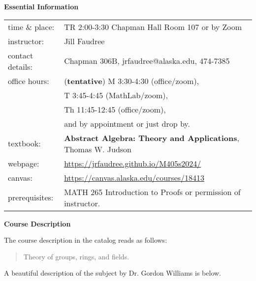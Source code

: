 \documentclass[12pt]{article}
\begin{document}
\textbf{\large{Essential Information}}

\begin{tabular}{p{} p{}}
{time \& place}:&TR 2:00-3:30 Chapman Hall Room 107 or by Zoom\\
{instructor:} &Jill Faudree\\
{contact details:} &Chapman 306B, jrfaudree@alaska.edu, 474-7385\\
{office hours:} &(\textbf{tentative})  M 3:30-4:30 (office/zoom), \\
& T 3:45-4:45 (MathLab/zoom),\\ 
&Th 11:45-12:45 (office/zoom),\\
&and by appointment or just drop by.\\
{textbook:}& \textbf{Abstract Algebra: Theory and Applications}, Thomas W. Judson\\
{webpage:}& \url{https://jrfaudree.github.io/M405s2024/}\\
canvas:&\url{https://canvas.alaska.edu/courses/18413}\\
{prerequisites:} & MATH 265 Introduction to Proofs or permission of instructor.
\end{tabular}



\textbf{\large{Course Description}}

The course description in the catalog reads as follows:
\begin{quote} Theory of groups, rings, and fields. \end{quote}

A beautiful description of the subject by Dr. Gordon Williams is below.
\end{document}
